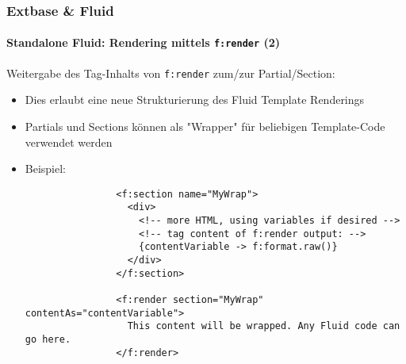 
\begin{frame}[fragile]
	\frametitle{Extbase \& Fluid}
	\framesubtitle{Standalone Fluid: Rendering mittels \texttt{f:render} (2)}

	\lstset{basicstyle=\tiny\ttfamily}

	Weitergabe des Tag-Inhalts von \texttt{f:render} zum/zur Partial/Section:

	\begin{itemize}

		\item Dies erlaubt eine neue Strukturierung des Fluid Template Renderings

		\item Partials und Sections können als "Wrapper" für beliebigen Template-Code verwendet werden

		\item Beispiel:

			\begin{lstlisting}
				<f:section name="MyWrap">
				  <div>
				    <!-- more HTML, using variables if desired -->
				    <!-- tag content of f:render output: -->
				    {contentVariable -> f:format.raw()}
				  </div>
				</f:section>

				<f:render section="MyWrap" contentAs="contentVariable">
				  This content will be wrapped. Any Fluid code can go here.
				</f:render>
			\end{lstlisting}

	\end{itemize}

\end{frame}


